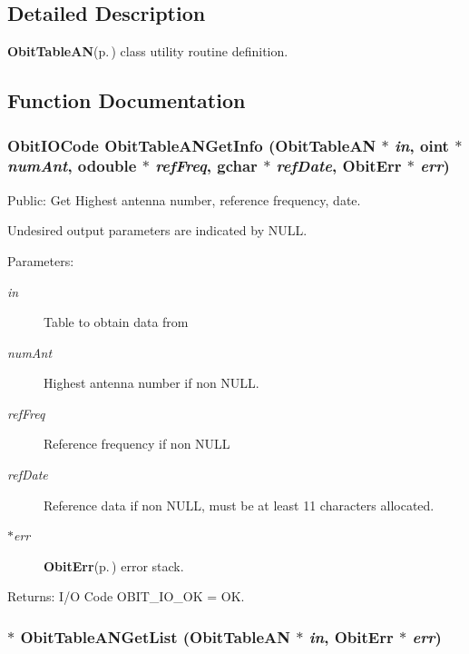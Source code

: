 \subsection{Detailed Description}
{\bf Obit\-Table\-AN}{\rm (p.\,\pageref{structObitTableAN})} class utility routine definition. 



\subsection{Function Documentation}
\subsubsection{\setlength{\rightskip}{0pt plus 5cm}Obit\-IOCode Obit\-Table\-ANGet\-Info ({\bf Obit\-Table\-AN} $\ast$ {\em in}, {\bf oint} $\ast$ {\em num\-Ant}, {\bf odouble} $\ast$ {\em ref\-Freq}, gchar $\ast$ {\em ref\-Date}, {\bf Obit\-Err} $\ast$ {\em err})}\label{ObitTableANUtil_8h_a0}


Public: Get Highest antenna number, reference frequency, date. 

Undesired output parameters are indicated by NULL. \begin{Desc}
\item[Parameters:]
\begin{description}
\item[{\em in}]Table to obtain data from \item[{\em num\-Ant}]Highest antenna number if non NULL. \item[{\em ref\-Freq}]Reference frequency if non NULL \item[{\em ref\-Date}]Reference data if non NULL, must be at least 11 characters allocated. \item[{\em $\ast$err}]{\bf Obit\-Err}{\rm (p.\,\pageref{structObitErr})} error stack. \end{description}
\end{Desc}
\begin{Desc}
\item[Returns:]I/O Code OBIT\_\-IO\_\-OK = OK. \end{Desc}
\subsubsection{$\ast$ Obit\-Table\-ANGet\-List ({\bf Obit\-Table\-AN} $\ast$ {\em in}, {\bf Obit\-Err} $\ast$ {\em err})}\label{ObitTableANUtil_8h_a1}


